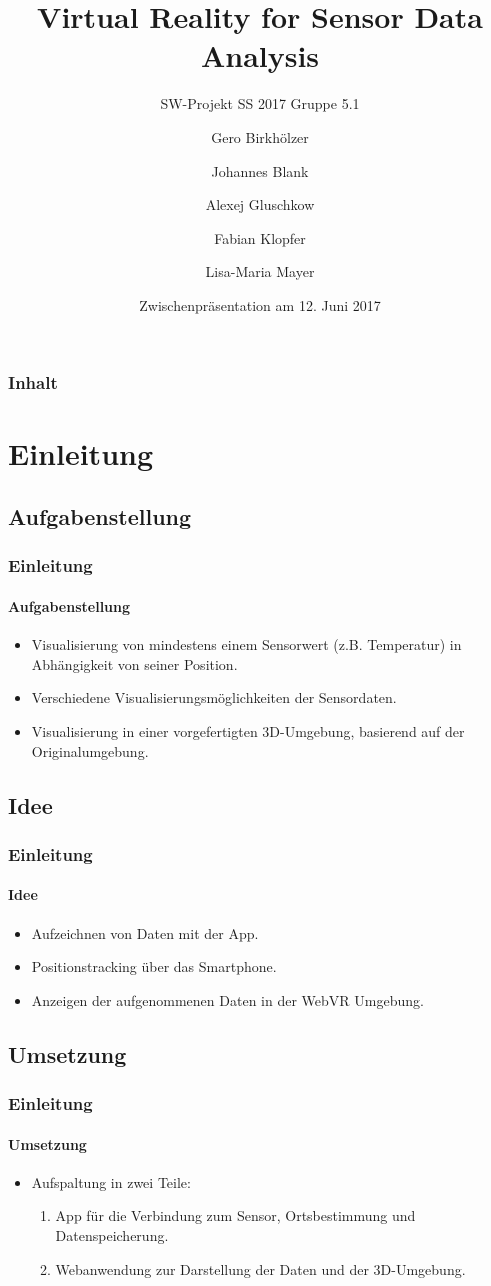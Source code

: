 \documentclass{beamer}
\title{Virtual Reality for Sensor Data Analysis}
\subtitle{SW-Projekt SS 2017 Gruppe 5.1}
\author{Gero Birkh\"olzer \and Johannes Blank \and Alexej Gluschkow \\ \and Fabian Klopfer \and Lisa-Maria Mayer}
\date{Zwischenpr\"asentation am 12. Juni 2017}
\begin{document}
\frame{\titlepage}



\begin{frame}
  \frametitle{Inhalt}
  \tableofcontents%
\end{frame}


\section{Einleitung}

\subsection{Aufgabenstellung}

\begin{frame}
\frametitle{Einleitung}
\framesubtitle{Aufgabenstellung}
\begin{itemize}
	\item Visualisierung von mindestens einem Sensorwert (z.B. Temperatur) in Abh\"angigkeit von seiner Position.
	\item Verschiedene Visualisierungsm\"oglichkeiten der Sensordaten.
	\item Visualisierung in einer vorgefertigten 3D-Umgebung, basierend auf der Originalumgebung.
\end{itemize}
\end{frame}

\subsection{Idee} %

\begin{frame}
\frametitle{Einleitung}
\framesubtitle{Idee}
\begin{itemize}
  \item Aufzeichnen von Daten mit der App.
  \item Positionstracking \"uber das Smartphone.
  \item Anzeigen der aufgenommenen Daten in der WebVR Umgebung.
\end{itemize}
\end{frame}

\subsection{Umsetzung} %

\begin{frame}
\frametitle{Einleitung}
\framesubtitle{Umsetzung}
\begin{itemize}
	\item Aufspaltung in zwei Teile: \pause
  \begin{enumerate}
    \item App f\"ur die Verbindung zum Sensor, Ortsbestimmung und Datenspeicherung.
    \item Webanwendung zur Darstellung der Daten und der 3D-Umgebung.
  \end{enumerate}
\end{itemize}
\end{frame}
\end{document}
